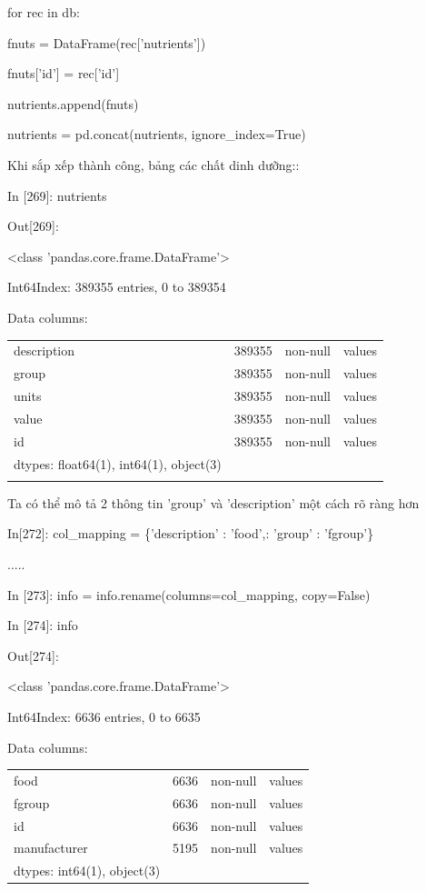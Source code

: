 \par\quad\textup{for rec in db:}
\par\quad\quad\textup{fnuts = DataFrame(rec['nutrients'])}
\par\quad\quad\textup{fnuts['id'] = rec['id']}
\par\quad\quad\textup{nutrients.append(fnuts)}
\par\quad\textup{nutrients = pd.concat(nutrients, ignore\_index=True)}
\par\textup {Khi sắp xếp thành công, bảng các chất dinh dưỡng::}
\par\quad\textup{In [269]: nutrients}
\par\quad\textup{Out[269]:}
\par\quad\textup{<class 'pandas.core.frame.DataFrame'>}
\par\quad\textup{Int64Index: 389355 entries, 0 to 389354}
\par\quad\textup{Data columns:}
\par\quad\begin{tabular}{llll}
description& 389355& non-null& values\\
group &389355& non-null& values\\
units &389355 &non-null& values\\
value &389355& non-null& values\\
id& 389355 &non-null& values\\
dtypes: float64(1), int64(1), object(3)\\
\par\end{tabular}
\par\textup{  Ta có thể mô tả 2 thông tin 'group' và 'description' một cách rõ ràng hơn}
\par\quad\textup{In[272]: col\_mapping = \{'description' : 'food',: 'group' : 'fgroup'\}}
\par\quad\quad\textup{.....}
\par\quad\textup{In [273]: info = info.rename(columns=col\_mapping, copy=False)}
\par\quad\textup{In [274]: info }
\par\quad\textup{Out[274]:}
\par\quad\textup{<class 'pandas.core.frame.DataFrame'>}
\par\quad\textup{Int64Index: 6636 entries, 0 to 6635}
\par\quad\textup{Data columns:}
\par\quad\begin{tabular}{llll}
food& 6636& non-null &values\\
fgroup &6636& non-null& values\\
id& 6636& non-null &values\\
manufacturer& 5195 &non-null &values\\
dtypes: int64(1), object(3)
\par\end{tabular}
